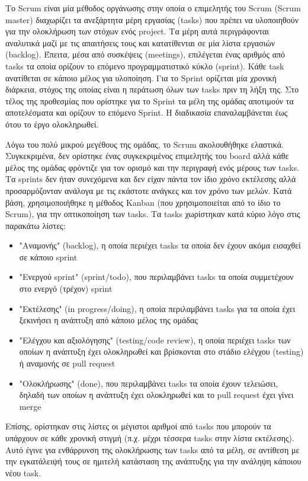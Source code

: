 Το Scrum είναι μία μέθοδος οργάνωσης στην οποία ο επιμελητής του Scrum (Scrum master) διαχωρίζει τα ανεξάρτητα μέρη εργασίας (tasks) που πρέπει να υλοποιηθούν για την ολοκλήρωση των στόχων ενός project. Τα μέρη αυτά περιγράφονται αναλυτικά μαζί με τις απαιτήσεις τους και κατατίθενται σε μία λίστα εργασιών (backlog). Έπειτα, μέσα από συσκέψεις (meetings), επιλέγεται ένας αριθμός από tasks τα οποία ορίζουν το επόμενο προγραμματιστικό κύκλο (sprint). Κάθε task ανατίθεται σε κάποιο μέλος για υλοποίηση. Για το Sprint ορίζεται μία χρονική διάρκεια, στόχος της οποίας είναι η περάτωση όλων των tasks πριν τη λήξη της. Στο τέλος της προθεσμίας που ορίστηκε για το Sprint τα μέλη της ομάδας αποτιμούν τα αποτελέσματα και ορίζουν το επόμενο Sprint. Η διαδικασία επαναλαμβάνεται έως ότου το έργο ολοκληρωθεί.

Λόγω του πολύ μικρού μεγέθους της ομάδας, το Scrum ακολουθήθηκε ελαστικά. Συγκεκριμένα, δεν ορίστηκε ένας συγκεκριμένος επιμελητής του board αλλά κάθε μέλος της ομάδας φρόντιζε για τον ορισμό και την περιγραφή ενός μέρους των tasks. Τα sprints δεν ήταν συνεχόμενα και δεν είχαν πάντα τον ίδιο χρόνο εκτέλεσης αλλά προσαρμόζονταν ανάλογα με τις εκάστοτε ανάγκες και τον χρόνο των μελών. Κατά βάση, χρησιμοποιήθηκε η μέθοδος Kanban (που χρησιμοποιείται από το ίδιο το Scrum), για την οπτικοποίηση των tasks. Τα tasks χωρίστηκαν κατά κύριο λόγο στις παρακάτω λίστες:

\begin{itemize}
    \item "Αναμονής" (backlog), η οποία περιέχει tasks τα οποία δεν έχουν ακόμα εισαχθεί σε κάποιο sprint
    \item "Ενεργού sprint" (sprint/todo), που περιλαμβάνει tasks τα οποία συμμετέχουν στο ενεργό (τρέχον) sprint
    \item "Εκτέλεσης" (in progress/doing), η οποία περιλαμβάνει tasks για τα οποία έχει ξεκινήσει η ανάπτυξη από κάποιο μέλος της ομάδας
    \item "Ελέγχου και αξιολόγησης" (testing/code review), η οποία περιέχει tasks των οποίων η ανάπτυξη έχει ολοκληρωθεί και βρίσκονται στο στάδιο ελέγχου (testing) ή αναμονής σε pull request
    \item "Ολοκλήρωσης" (done), που περιλαμβάνει tasks τα οποία έχουν τελειώσει, δηλαδή των οποίων η ανάπτυξη έχει ολοκληρωθεί και το pull request έχει γίνει merge
\end{itemize}

Επίσης, ορίστηκαν στις λίστες οι μέγιστοι αριθμοί από tasks που μπορούν τα υπάρχουν σε κάθε χρονική στιγμή (π.χ. μέχρι τέσσερα tasks στην λίστα εκτέλεσης). Αυτό έγινε για ενθάρρυνση της ολοκλήρωσης των tasks από τα μέλη, σε αντίθεση με την εγκατάλειψή τους σε ημιτελή κατάσταση της ανάπτυξης για την ανάληψη κάποιου νέου task.

